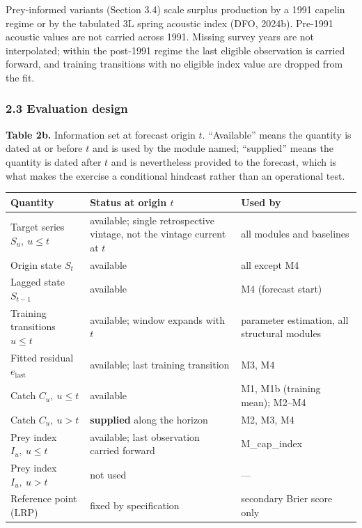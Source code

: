 \documentclass[11pt]{article}
\begin{document}
Prey-informed variants (Section 3.4) scale surplus production by a 1991
capelin regime or by the tabulated 3L spring acoustic index (DFO,
2024b). Pre-1991 acoustic values are not carried across 1991. Missing
survey years are not interpolated; within the post-1991 regime the last
eligible observation is carried forward, and training transitions with
no eligible index value are dropped from the fit.

\subsubsection{2.3 Evaluation design}\label{cod-evaluation-design}

\textbf{Table 2b.} Information set at forecast origin \(t\). ``Available''
means the quantity is dated at or before \(t\) and is used by the module
named; ``supplied'' means the quantity is dated after \(t\) and is
nevertheless provided to the forecast, which is what makes the exercise a
conditional hindcast rather than an operational test.

\begin{longtable}[]{@{}
  >{\raggedright\arraybackslash}p{}
  >{\raggedright\arraybackslash}p{}
  >{\raggedright\arraybackslash}p{}@{}}
\toprule\noalign{}
Quantity & Status at origin \(t\) & Used by \\
\midrule\noalign{}
\endhead
\bottomrule\noalign{}
\endlastfoot
Target series \(S_u,\ u\le t\) & available; single retrospective vintage, not the vintage current at \(t\) & all modules and baselines \\
Origin state \(S_t\) & available & all except M4 \\
Lagged state \(S_{t-1}\) & available & M4 (forecast start) \\
Training transitions \(u\le t\) & available; window expands with \(t\) & parameter estimation, all structural modules \\
Fitted residual \(e_{\mathrm{last}}\) & available; last training transition & M3, M4 \\
Catch \(C_u,\ u\le t\) & available & M1, M1b (training mean); M2--M4 \\
Catch \(C_u,\ u>t\) & \textbf{supplied} along the horizon & M2, M3, M4 \\
Prey index \(I_u,\ u\le t\) & available; last observation carried forward & M\_cap\_index \\
Prey index \(I_u,\ u>t\) & not used & --- \\
Reference point (LRP) & fixed by specification & secondary Brier score only \\
\end{longtable}
\end{document}
